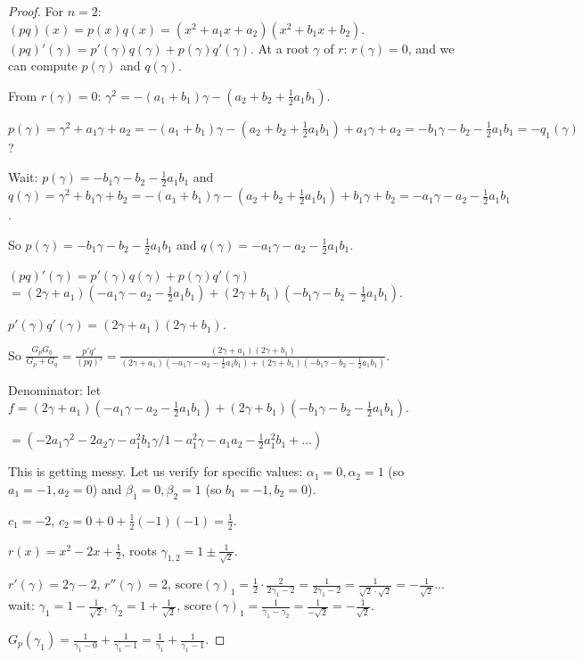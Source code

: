 \documentclass[12pt]{article}
\theoremstyle{definition}
\newcommand{\score}{\mathrm{score}}
\begin{document}
\begin{proof}
For $n=2$: $(pq)(x)=p(x)q(x)=(x^2+a_1x+a_2)(x^2+b_1x+b_2)$.
$(pq)'(\gamma)=p'(\gamma)q(\gamma)+p(\gamma)q'(\gamma)$.
At a root $\gamma$ of $r$: $r(\gamma)=0$, and we can compute $p(\gamma)$ and $q(\gamma)$.

From $r(\gamma)=0$: $\gamma^2=-( a_1+b_1)\gamma-(a_2+b_2+\frac{1}{2}a_1b_1)$.

$p(\gamma)=\gamma^2+a_1\gamma+a_2=-(a_1+b_1)\gamma-(a_2+b_2+\frac{1}{2}a_1b_1)+a_1\gamma+a_2
=-b_1\gamma-b_2-\frac{1}{2}a_1b_1=-q_1(\gamma)$?

Wait: $p(\gamma)=-b_1\gamma-b_2-\frac{1}{2}a_1b_1$ and $q(\gamma)=\gamma^2+b_1\gamma+b_2
=-(a_1+b_1)\gamma-(a_2+b_2+\frac{1}{2}a_1b_1)+b_1\gamma+b_2
=-a_1\gamma-a_2-\frac{1}{2}a_1b_1$.

So $p(\gamma)=-b_1\gamma-b_2-\frac{1}{2}a_1b_1$ and $q(\gamma)=-a_1\gamma-a_2-\frac{1}{2}a_1b_1$.

$(pq)'(\gamma)=p'(\gamma)q(\gamma)+p(\gamma)q'(\gamma)$
$=(2\gamma+a_1)(-a_1\gamma-a_2-\frac{1}{2}a_1b_1)+(2\gamma+b_1)(-b_1\gamma-b_2-\frac{1}{2}a_1b_1)$.

$p'(\gamma)q'(\gamma)=(2\gamma+a_1)(2\gamma+b_1)$.

So $\frac{G_p G_q}{G_p+G_q}=\frac{p'q'}{(pq)'}=\frac{(2\gamma+a_1)(2\gamma+b_1)}{(2\gamma+a_1)(-a_1\gamma-a_2-\frac{1}{2}a_1b_1)+(2\gamma+b_1)(-b_1\gamma-b_2-\frac{1}{2}a_1b_1)}$.

Denominator: let $f=(2\gamma+a_1)(-a_1\gamma-a_2-\frac{1}{2}a_1b_1)+(2\gamma+b_1)(-b_1\gamma-b_2-\frac{1}{2}a_1b_1)$.

$=(-2a_1\gamma^2-2a_2\gamma-a_1^2b_1\gamma/1-a_1^2\gamma-a_1a_2-\frac{1}{2}a_1^2b_1+\ldots)$

This is getting messy. Let us verify for specific values: $\alpha_1=0,\alpha_2=1$ (so $a_1=-1, a_2=0$) and $\beta_1=0, \beta_2=1$ (so $b_1=-1, b_2=0$).

$c_1=-2$, $c_2=0+0+\frac{1}{2}(-1)(-1)=\frac{1}{2}$.

$r(x)=x^2-2x+\frac{1}{2}$, roots $\gamma_{1,2}=1\pm\frac{1}{\sqrt{2}}$.

$r'(\gamma)=2\gamma-2$, $r''(\gamma)=2$, $\score(\gamma)_1=\frac{1}{2}\cdot\frac{2}{2\gamma_1-2}=\frac{1}{2\gamma_1-2}=\frac{1}{\sqrt{2}\cdot\sqrt{2}}=-\frac{1}{\sqrt{2}}$... wait:
$\gamma_1=1-\frac{1}{\sqrt{2}}$, $\gamma_2=1+\frac{1}{\sqrt{2}}$, $\score(\gamma)_1=\frac{1}{\gamma_1-\gamma_2}=\frac{1}{-\sqrt{2}}=-\frac{1}{\sqrt{2}}$.

$G_p(\gamma_1)=\frac{1}{\gamma_1-0}+\frac{1}{\gamma_1-1}=\frac{1}{\gamma_1}+\frac{1}{\gamma_1-1}$.


\end{proof}
\end{document}
